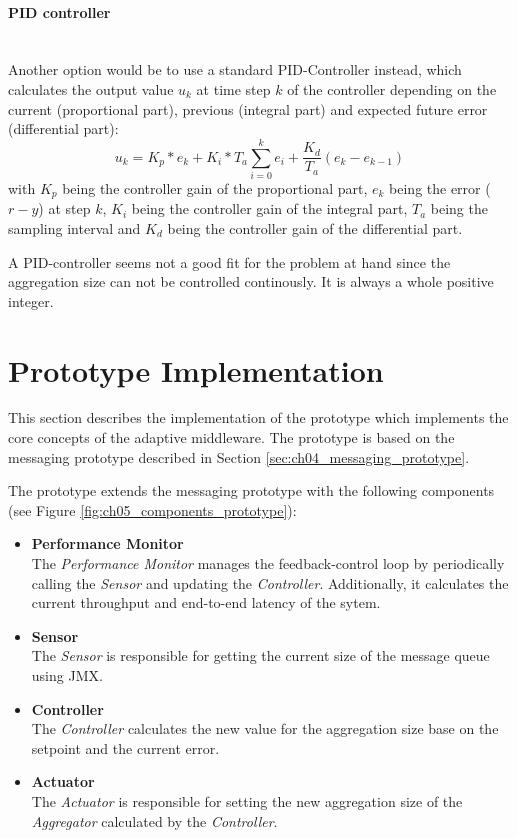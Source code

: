 \paragraph{PID controller}\mbox{}\\
Another option would be to use a standard PID-Controller instead, which calculates the output value $u_k$ at time step $k$ of the controller depending on the current (proportional part), previous (integral part) and expected future error (differential part):
\begin{displaymath}
	u_k=K_p*e_k+K_i*T_a\sum_{i=0}^k e_i+\frac{K_d}{T_a}(e_k-e_{k-1})
\end{displaymath}
with $K_p$ being the controller gain of the proportional part, $e_k$ being the error ($r-y$) at step $k$, $K_i$ being the controller gain of the integral part, $T_a$ being the sampling interval and $K_d$ being the controller gain of the differential part.

A PID-controller seems not a good fit for the problem at hand since the aggregation size can not be controlled continously. It is always a whole positive integer.

\section{Prototype Implementation}
\label{sec:ch05_prototype}

This section describes the implementation of the prototype which implements the core concepts of the adaptive middleware. The prototype is based on the messaging prototype described in Section \ref{sec:ch04_messaging_prototype}.

The prototype extends the messaging prototype with the following components (see Figure \ref{fig:ch05_components_prototype}):
\begin{itemize}
	\item \textbf{Performance Monitor}\\
	The \emph{Performance Monitor} manages the feedback-control loop by periodically calling the \emph{Sensor} and updating the \emph{Controller}. Additionally, it calculates the current throughput and end-to-end latency of the sytem.
	\item \textbf{Sensor}\\
	The \emph{Sensor} is responsible for getting the current size of the message queue using \ac{JMX}.
	\item \textbf{Controller}\\
	The \emph{Controller} calculates the new value for the aggregation size base on the setpoint and the current error.
	\item \textbf{Actuator}\\
	The \emph{Actuator} is responsible for setting the new aggregation size of the \emph{Aggregator} calculated by the \emph{Controller}.
\end{itemize}

